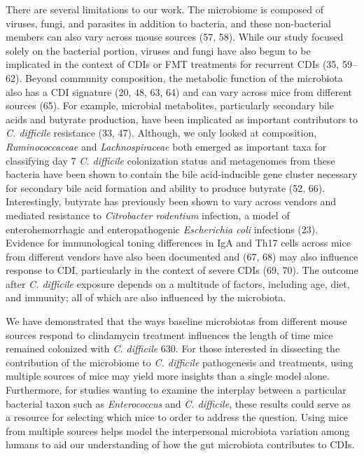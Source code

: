 \documentclass[11pt,]{article}
\begin{document}
There are several limitations to our work. The microbiome is composed of
viruses, fungi, and parasites in addition to bacteria, and these
non-bacterial members can also vary across mouse sources (57, 58). While
our study focused solely on the bacterial portion, viruses and fungi
have also begun to be implicated in the context of CDIs or FMT
treatments for recurrent CDIs (35, 59--62). Beyond community
composition, the metabolic function of the microbiota also has a CDI
signature (20, 48, 63, 64) and can vary across mice from different
sources (65). For example, microbial metabolites, particularly secondary
bile acids and butyrate production, have been implicated as important
contributors to \emph{C. difficile} resistance (33, 47). Although, we
only looked at composition, \emph{Ruminococcaceae} and
\emph{Lachnospiraceae} both emerged as important taxa for classifying
day 7 \emph{C. difficile} colonization status and metagenomes from these
bacteria have been shown to contain the bile acid-inducible gene cluster
necessary for secondary bile acid formation and ability to produce
butyrate (52, 66). Interestingly, butyrate has previously been shown to
vary across vendors and mediated resistance to \emph{Citrobacter
rodentium} infection, a model of enterohemorrhagic and enteropathogenic
\emph{Escherichia coli} infections (23). Evidence for immunological
toning differences in IgA and Th17 cells across mice from different
vendors have also been documented and (67, 68) may also influence
response to CDI, particularly in the context of severe CDIs (69, 70).
The outcome after \emph{C. difficile} exposure depends on a multitude of
factors, including age, diet, and immunity; all of which are also
influenced by the microbiota.

We have demonstrated that the ways baseline microbiotas from different
mouse sources respond to clindamycin treatment influences the length of
time mice remained colonized with \emph{C. difficile} 630. For those
interested in dissecting the contribution of the microbiome to \emph{C.
difficile} pathogenesis and treatments, using multiple sources of mice
may yield more insights than a single model alone. Furthermore, for
studies wanting to examine the interplay between a particular bacterial
taxon such as \emph{Enterococcus} and \emph{C. difficile}, these results
could serve as a resource for selecting which mice to order to address
the question. Using mice from multiple sources helps model the
interpersonal microbiota variation among humans to aid our understanding
of how the gut microbiota contributes to CDIs.
\end{document}
